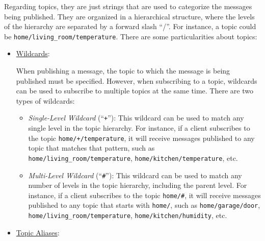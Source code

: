 Regarding topics, they are just strings that are used to categorize the messages being published. They are organized in a hierarchical structure, where the levels of the hierarchy are separated by a forward slash ``/''. For instance, a topic could be \texttt{home/living\_room/temperature}. There are some particularities about topics:
\begin{itemize}
    \item \ul{Wildcards}:
    
    When publishing a message, the topic to which the message is being published must be specified. However, when subscribing to a topic, wildcards can be used to subscribe to multiple topics at the same time. There are two types of wildcards:
    \begin{itemize}
        \item \emph{Single-Level Wildcard} (``\texttt{+}''): This wildcard can be used to match any single level in the topic hierarchy. For instance, if a client subscribes to the topic \texttt{home/+/temperature}, it will receive messages published to any topic that matches that pattern, such as \texttt{home/living\_room/temperature}, \texttt{home/kitchen/temperature}, etc.
        \item \emph{Multi-Level Wildcard} (``\texttt{\#}''): This wildcard can be used to match any number of levels in the topic hierarchy, including the parent level. For instance, if a client subscribes to the topic \texttt{home/\#}, it will receive messages published to any topic that starts with \texttt{home/}, such as \texttt{home/garage/door}, \texttt{home/living\_room/temperature}, \texttt{home/kitchen/humidity}, etc.
    \end{itemize}

    \item \ul{Topic Aliases}:
    

\end{itemize}
